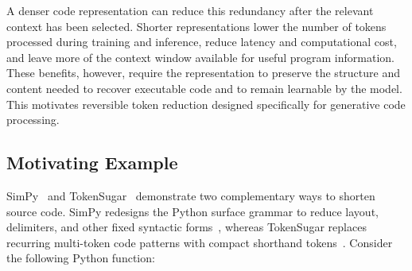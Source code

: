 A denser code representation can reduce this redundancy after the relevant context has been selected. Shorter representations lower the number of tokens processed during training and inference, reduce latency and computational cost, and leave more of the context window available for useful program information. These benefits, however, require the representation to preserve the structure and content needed to recover executable code and to remain learnable by the model. This motivates reversible token reduction designed specifically for generative code processing.

\subsection{Motivating Example}



SimPy~\cite{simpy2024} and TokenSugar~\cite{tokensugar2024} demonstrate two complementary ways to shorten source code. SimPy redesigns the Python surface grammar to reduce layout, delimiters, and other fixed syntactic forms~\cite{simpy2024}, whereas TokenSugar replaces recurring multi-token code patterns with compact shorthand tokens~\cite{tokensugar2024}. Consider the following Python function:

\begin{center}
\setlength{\fboxsep}{6pt}
\end{center}

